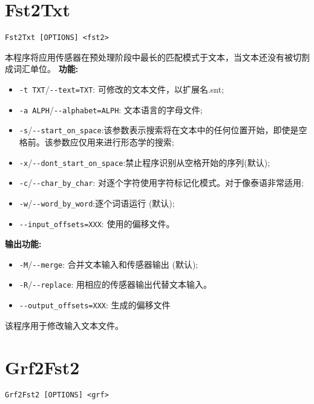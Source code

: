 






\section{Fst2Txt}
\label{section-Fst2Txt}
\verb+Fst2Txt [OPTIONS] <fst2>+

\bigskip
\noindent 本程序将应用传感器在预处理阶段中最长的匹配模式于文本，当文本还没有被切割成词汇单位。
\bigskip
\noindent \textbf{功能:}
\begin{itemize}
  \item \verb+-t TXT+/\verb+--text=TXT+: 可修改的文本文件，以扩展名.snt;
  
  \item \verb+-a ALPH+/\verb+--alphabet=ALPH+: 文本语言的字母文件;

  \item \verb+-s+/\verb+--start_on_space+:该参数表示搜索将在文本中的任何位置开始，即使是空格前。该参数应仅用来进行形态学的搜索; 
  	  
  \item \verb+-x+/\verb+--dont_start_on_space+:禁止程序识别从空格开始的序列(默认);
  
  \item \verb+-c+/\verb+--char_by_char+:  对逐个字符使用字符标记化模式。对于像泰语非常适用;

  \item \verb+-w+/\verb+--word_by_word+:逐个词语运行 (默认);
  \item \verb+--input_offsets=XXX+: 使用的偏移文件。
\end{itemize}

\bigskip
\noindent \textbf{输出功能:}
\begin{itemize}
\item \verb+-M+/\verb+--merge+: 合并文本输入和传感器输出 (默认);
\item \verb+-R+/\verb+--replace+: 用相应的传感器输出代替文本输入。
\item \verb+--output_offsets=XXX+: 生成的偏移文件
\end{itemize}

\bigskip
\noindent 该程序用于修改输入文本文件。







\section{Grf2Fst2}
\verb+Grf2Fst2 [OPTIONS] <grf>+

